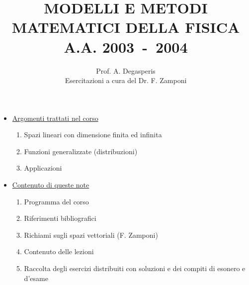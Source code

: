 \documentclass[a4paper,10pt]{article}
\begin{document}
\title{MODELLI E METODI MATEMATICI DELLA
FISICA
\\A.A. 2003\ -\ 2004}
\author{Prof. A. Degasperis \\ Esercitazioni a cura del Dr. F. Zamponi}

\maketitle
\begin{itemize}
\item{\underline{Argomenti trattati nel corso}}
\begin{enumerate}
\item Spazi lineari con dimensione finita ed infinita
\item Funzioni generalizzate (distribuzioni)
\item Applicazioni 
\end{enumerate}
\item{\underline{Contenuto di queste note}}
\begin{enumerate}
\item Programma del corso
\item Riferimenti bibliografici
\item Richiami sugli spazi vettoriali (F. Zamponi)
\item Contenuto delle lezioni 
\item Raccolta degli esercizi distribuiti con soluzioni e dei compiti di esonero e d'esame
\end{enumerate}
\end{itemize}

\newpage
\end{document}
